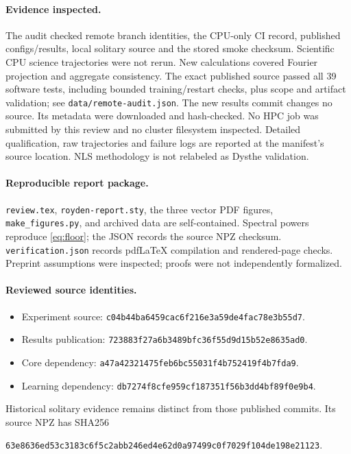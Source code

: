 \documentclass[11pt]{article}
\begin{document}
\paragraph{Evidence inspected.}
The audit checked remote branch identities, the CPU-only CI record, published
configs/results, local solitary source and the stored smoke checksum. Scientific
CPU science trajectories were not rerun. New calculations covered Fourier
projection and aggregate consistency. The exact published source passed all 39
software tests, including bounded training/restart checks, plus scope and artifact
validation; see \texttt{data/remote-audit.json}. The new results commit changes
no source. Its metadata were downloaded and hash-checked. No HPC job was
submitted by this review and no cluster filesystem inspected. Detailed
qualification, raw trajectories and failure logs are reported at the manifest's
source location. NLS methodology is not relabeled as Dysthe validation.

\paragraph{Reproducible report package.}
\texttt{review.tex}, \texttt{royden-report.sty}, the three vector PDF figures,
\texttt{make\_figures.py}, and archived data are self-contained. Spectral powers
reproduce \eqref{eq:floor}; the JSON records the source NPZ checksum.
\texttt{verification.json} records pdfLaTeX compilation and rendered-page checks.
Preprint assumptions were inspected; proofs were not independently formalized.

\paragraph{Reviewed source identities.}
\begin{itemize}
\item Experiment source: \texttt{c04b44ba6459cac6f216e3a59de4fac78e3b55d7}.
\item Results publication: \texttt{723883f27a6b3489bfc36f55d9d15b52e8635ad0}.
\item Core dependency: \texttt{a47a42321475feb6bc55031f4b752419f4b7fda9}.
\item Learning dependency: \texttt{db7274f8cfe959cf187351f56b3dd4bf89f0e9b4}.
\end{itemize}
Historical solitary evidence remains distinct from those published commits.
Its source NPZ has SHA256
\begin{center}\footnotesize
\texttt{63e8636ed53c3183c6f5c2abb246ed4e62d0a97499c0f7029f104de198e21123}.
\end{center}
\end{document}
